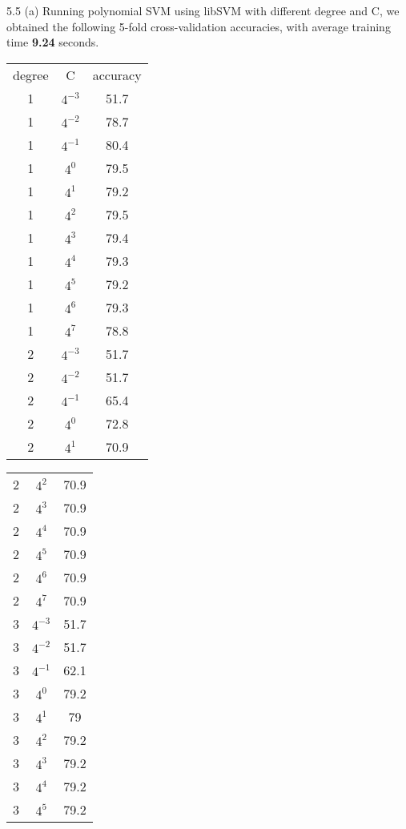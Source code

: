 \documentclass[12pt]{article}
\newenvironment{problem}[2][Problem]{\begin{trivlist}
\item[\hskip \labelsep {\bfseries #1}\hskip \labelsep {\bfseries #2}]}{\end{trivlist}}
\begin{document}
\begin{problem}{5. Programming}
\item{5.5 (a)}
Running polynomial SVM using libSVM with different degree and C, we obtained the following 5-fold cross-validation accuracies, with average training time \textbf{9.24} seconds.
\begin{center}
\begin{tabular}{ c | c | c }
    degree &   C  &  accuracy\\
    1 &  $4^{-3}$  & 51.7\\
    1 &  $4^{-2}$  & 78.7\\
    1 &  $4^{-1}$  & 80.4\\
    1  &  $4^{0}$  & 79.5\\
    1  &  $4^{1}$ & 79.2\\
    1  &  $4^{2}$ & 79.5\\
    1  &  $4^{3}$ & 79.4\\
    1  &  $4^{4}$ & 79.3\\
    1  &  $4^{5}$ & 79.2\\
    1  &  $4^{6}$ &79.3\\
    1  &  $4^{7}$ & 78.8\\
    2  & $4^{-3}$ & 51.7\\
    2  & $4^{-2}$ & 51.7\\
    2  & $4^{-1}$ & 65.4\\
    2  &  $4^{0}$ & 72.8\\
    2  &  $4^{1}$ &70.9\\
\end{tabular}
\begin{tabular}{ c | c | c }
    2  &  $4^{2}$ & 70.9\\
    2  &  $4^{3}$ & 70.9\\
    2  &  $4^{4}$ & 70.9\\
    2  &  $4^{5}$ & 70.9\\
    2  &  $4^{6}$  &70.9\\
    2  &  $4^{7}$  &70.9\\
    3  & $4^{-3}$  &51.7\\
    3  & $4^{-2}$  &51.7\\
    3  & $4^{-1}$ & 62.1\\
    3  &  $4^{0}$  &79.2\\
    3  &  $4^{1}$ & 79\\
    3  &  $4^{2}$  &79.2\\
    3  &  $4^{3}$  &79.2\\
    3  &  $4^{4}$  &79.2\\
    3  &  $4^{5}$  &79.2\\

\end{tabular}
\end{center}
\end{problem}
\end{document}
